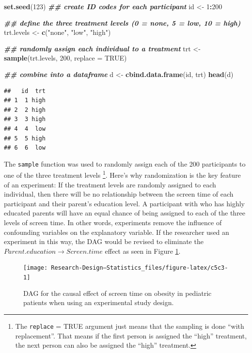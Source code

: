 \documentclass[
]{book}
\newenvironment{Shaded}{\begin{snugshade}}{\end{snugshade}}
\newcommand{\AttributeTok}[1]{\textcolor[rgb]{0.13,0.29,0.53}{#1}}
\newcommand{\ConstantTok}[1]{\textcolor[rgb]{0.56,0.35,0.01}{#1}}
\newcommand{\DecValTok}[1]{\textcolor[rgb]{0.00,0.00,0.81}{#1}}
\newcommand{\DocumentationTok}[1]{\textcolor[rgb]{0.56,0.35,0.01}{\textbf{\textit{#1}}}}
\newcommand{\FunctionTok}[1]{\textcolor[rgb]{0.13,0.29,0.53}{\textbf{#1}}}
\newcommand{\NormalTok}[1]{#1}
\newcommand{\OtherTok}[1]{\textcolor[rgb]{0.56,0.35,0.01}{#1}}
\newcommand{\SpecialCharTok}[1]{\textcolor[rgb]{0.81,0.36,0.00}{\textbf{#1}}}
\newcommand{\StringTok}[1]{\textcolor[rgb]{0.31,0.60,0.02}{#1}}
\begin{document}
\begin{Shaded}
\begin{Highlighting}[]
\FunctionTok{set.seed}\NormalTok{(}\DecValTok{123}\NormalTok{)}
\DocumentationTok{\#\# create ID codes for each participant}
\NormalTok{id }\OtherTok{\textless{}{-}} \DecValTok{1}\SpecialCharTok{:}\DecValTok{200}

\DocumentationTok{\#\# define the three treatment levels (0 = none, 5 = low, 10 = high)}
\NormalTok{trt.levels }\OtherTok{\textless{}{-}} \FunctionTok{c}\NormalTok{(}\StringTok{"none"}\NormalTok{, }\StringTok{"low"}\NormalTok{, }\StringTok{"high"}\NormalTok{)}

\DocumentationTok{\#\# randomly assign each individual to a treatment}
\NormalTok{trt }\OtherTok{\textless{}{-}} \FunctionTok{sample}\NormalTok{(trt.levels, }\DecValTok{200}\NormalTok{, }\AttributeTok{replace =} \ConstantTok{TRUE}\NormalTok{)}

\DocumentationTok{\#\# combine into a dataframe}
\NormalTok{d }\OtherTok{\textless{}{-}} \FunctionTok{cbind.data.frame}\NormalTok{(id, trt)}
\FunctionTok{head}\NormalTok{(d)}
\end{Highlighting}
\end{Shaded}

\begin{verbatim}
##   id  trt
## 1  1 high
## 2  2 high
## 3  3 high
## 4  4  low
## 5  5 high
## 6  6  low
\end{verbatim}

The \texttt{sample} function was used to randomly assign each of the 200 participants to one of the three treatment levels \footnote{The \texttt{replace} = TRUE argument just means that the sampling is done ``with replacement''. That means if the first person is assigned the ``high'' treatment, the next person can also be assigned the ``high'' treatment.}. Here's why randomization is the key feature of an experiment: If the treatment levels are randomly assigned to each individual, then there will be no relationship between the screen time of each participant and their parent's education level. A participant with who has highly educated parents will have an equal chance of being assigned to each of the three levels of screen time. In other words, experiments remove the influence of confounding variables on the explanatory variable. If the researcher used an experiment in this way, the DAG would be revised to eliminate the \(Parent.education \to Screen.time\) effect as seen in Figure \ref{fig:c5c3}.

\begin{figure}

{\centering \texttt{[image: Research-Design---Statistics\_files/figure-latex/c5c3-1]} 

}

\caption{DAG for the causal effect of screen time on obesity in pediatric patients when using an experimental study design.}\label{fig:c5c3}
\end{figure}
\end{document}
